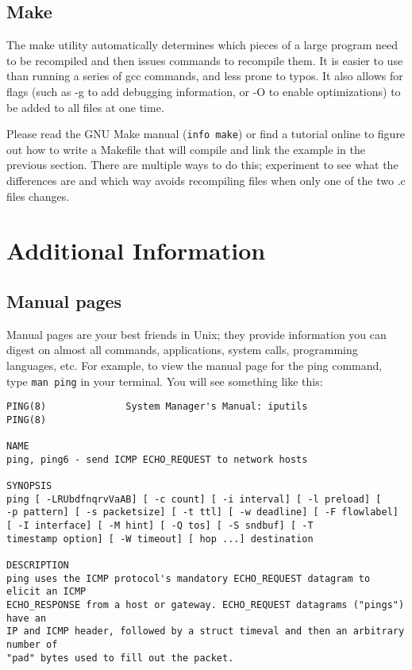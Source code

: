 \documentclass[letterpaper,10pt]{article}
\newcommand{\cmd}[1]{\texttt{#1}}
\begin{document}
\subsection{Make}
The make utility automatically determines which pieces of a large program need to be recompiled and then issues commands to recompile them. It is easier to use than running a series of gcc commands, and less prone to typos. It also allows for flags (such as -g to add debugging information, or -O to enable optimizations) to be added to all files at one time.

Please read the GNU Make manual (\cmd{info make}) or find a tutorial online to figure out how to write a Makefile that will compile and link the example in the previous section. There are multiple ways to do this; experiment to see what the differences are and which way avoids recompiling files when only one of the two .c files changes.

\section{Additional Information}
\subsection{Manual pages}
Manual pages are your best friends in Unix; they provide information you can digest on almost all commands, applications, system calls, programming languages, etc. For example, to view the manual page for the ping command, type \cmd{man ping} in your terminal. You will see something like this:

\begin{verbatim}
PING(8)              System Manager's Manual: iputils                 PING(8)

NAME
ping, ping6 - send ICMP ECHO_REQUEST to network hosts

SYNOPSIS
ping [ -LRUbdfnqrvVaAB] [ -c count] [ -i interval] [ -l preload] [
-p pattern] [ -s packetsize] [ -t ttl] [ -w deadline] [ -F flowlabel]
[ -I interface] [ -M hint] [ -Q tos] [ -S sndbuf] [ -T
timestamp option] [ -W timeout] [ hop ...] destination

DESCRIPTION
ping uses the ICMP protocol's mandatory ECHO_REQUEST datagram to elicit an ICMP
ECHO_RESPONSE from a host or gateway. ECHO_REQUEST datagrams ("pings") have an
IP and ICMP header, followed by a struct timeval and then an arbitrary number of
"pad" bytes used to fill out the packet.
\end{verbatim}
\end{document}
